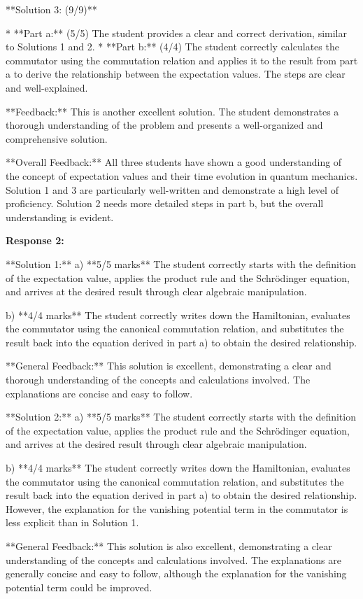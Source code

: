 \documentclass[a4paper,11pt]{article}
\begin{document}
**Solution 3: (9/9)**

*   **Part a:** (5/5) The student provides a clear and correct derivation, similar to Solutions 1 and 2.
*   **Part b:** (4/4) The student correctly calculates the commutator using the commutation relation and applies it to the result from part a to derive the relationship between the expectation values. The steps are clear and well-explained.

**Feedback:** This is another excellent solution. The student demonstrates a thorough understanding of the problem and presents a well-organized and comprehensive solution.

**Overall Feedback:** All three students have shown a good understanding of the concept of expectation values and their time evolution in quantum mechanics. Solution 1 and 3 are particularly well-written and demonstrate a high level of proficiency. Solution 2 needs more detailed steps in part b, but the overall understanding is evident.

\textbf{Response 2:}

**Solution 1:**
a) **5/5 marks**
The student correctly starts with the definition of the expectation value, applies the product rule and the Schrödinger equation, and arrives at the desired result through clear algebraic manipulation.

b) **4/4 marks**
The student correctly writes down the Hamiltonian, evaluates the commutator using the canonical commutation relation, and substitutes the result back into the equation derived in part a) to obtain the desired relationship.

**General Feedback:** This solution is excellent, demonstrating a clear and thorough understanding of the concepts and calculations involved. The explanations are concise and easy to follow.

**Solution 2:**
a) **5/5 marks**
The student correctly starts with the definition of the expectation value, applies the product rule and the Schrödinger equation, and arrives at the desired result through clear algebraic manipulation.

b) **4/4 marks**
The student correctly writes down the Hamiltonian, evaluates the commutator using the canonical commutation relation, and substitutes the result back into the equation derived in part a) to obtain the desired relationship. However, the explanation for the vanishing potential term in the commutator is less explicit than in Solution 1.

**General Feedback:** This solution is also excellent, demonstrating a clear understanding of the concepts and calculations involved. The explanations are generally concise and easy to follow, although the explanation for the vanishing potential term could be improved.
\end{document}
